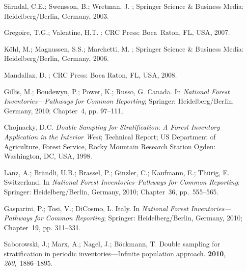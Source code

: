 \documentclass[remotesensing,article,accept,moreauthors,pdftex,10pt,a4paper]{Definitions/mdpi}
\begin{document}
\begin{thebibliography}{999}
S{\"a}rndal, C.E.; Swensson, B.; Wretman, J.
; Springer Science \& Business
  Media: Heidelberg/Berlin, Germany,  2003.

Gregoire, T.G.; Valentine, H.T.
;
  CRC Press: Boca~Raton, FL, USA, 2007.

K{\"o}hl, M.; Magnussen, S.S.; Marchetti, M.
; Springer Science \& Business Media: Heidelberg/Berlin, Germany,  2006.

Mandallaz, D.
;  CRC Press: Boca Raton, FL, USA,  2008.


Gillis, M.; Boudewyn, P.; Power, K.; Russo, G.
\newblock Canada. In {\em National Forest Inventories---Pathways for Common
  Reporting}; Springer: Heidelberg/Berlin, Germany,  2010; Chapter~4, pp. 97--111,


Chojnacky, D.C.
\newblock \emph{Double Sampling for Stratification: A Forest Inventory Application in
  the Interior West};
\newblock Technical Report; US Department of Agriculture, Forest Service, Rocky
  Mountain Research Station Ogden: Washington, DC, USA, 1998.

Lanz, A.; Br{\"a}ndli, U.B.; Brassel, P.; Ginzler, C.; Kaufmann, E.;
  Th{\"u}rig, E.
\newblock Switzerland. In {\em National Forest Inventories--Pathways for
  Common Reporting}; Springer: Heidelberg/Berlin, Germany,  2010; Chapter~36, pp.~555–565.


Gasparini, P.; Tosi, V.; DiCosmo, L.
\newblock Italy. In {\em National Forest Inventories---Pathways for Common
  Reporting}; Springer: Heidelberg/Berlin, Germany, 2010; Chapter~19, pp. 311–331.


Saborowski, J.; Marx, A.; Nagel, J.; B{\"o}ckmann, T.
\newblock Double sampling for stratification in periodic inventories—Infinite
  population approach.
 {\bf 2010}, {\em
  260},~1886--1895.


\end{thebibliography}
\end{document}
